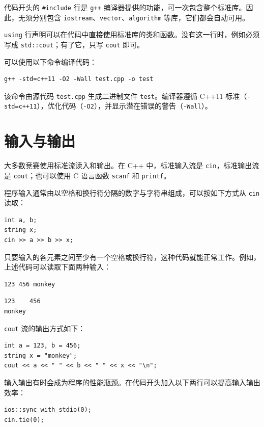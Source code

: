 代码开头的 \texttt{\#include} 行是 \texttt{g++} 编译器提供的功能，可一次包含整个标准库。因此，无须分别包含 \texttt{iostream}、\texttt{vector}、\texttt{algorithm} 等库，它们都会自动可用。

\texttt{using} 行声明可以在代码中直接使用标准库的类和函数。没有这一行时，例如必须写成 \texttt{std::cout}；有了它，只写 \texttt{cout} 即可。

可以使用以下命令编译代码：

\begin{lstlisting}
g++ -std=c++11 -O2 -Wall test.cpp -o test
\end{lstlisting}

该命令由源代码 \texttt{test.cpp} 生成二进制文件 \texttt{test}。编译器遵循 C++11 标准（\texttt{-std=c++11}），优化代码（\texttt{-O2}），并显示潜在错误的警告（\texttt{-Wall}）。

\section{输入与输出}


大多数竞赛使用标准流读入和输出。在 C++ 中，标准输入流是 \texttt{cin}，标准输出流是 \texttt{cout}；也可以使用 C 语言函数 \texttt{scanf} 和 \texttt{printf}。

程序输入通常由以空格和换行符分隔的数字与字符串组成，可以按如下方式从 \texttt{cin} 读取：

\begin{lstlisting}
int a, b;
string x;
cin >> a >> b >> x;
\end{lstlisting}

只要输入的各元素之间至少有一个空格或换行符，这种代码就能正常工作。例如，上述代码可以读取下面两种输入：
\begin{lstlisting}
123 456 monkey
\end{lstlisting}
\begin{lstlisting}
123    456
monkey
\end{lstlisting}
\texttt{cout} 流的输出方式如下：
\begin{lstlisting}
int a = 123, b = 456;
string x = "monkey";
cout << a << " " << b << " " << x << "\n";
\end{lstlisting}

输入输出有时会成为程序的性能瓶颈。在代码开头加入以下两行可以提高输入输出效率：

\begin{lstlisting}
ios::sync_with_stdio(0);
cin.tie(0);
\end{lstlisting}

